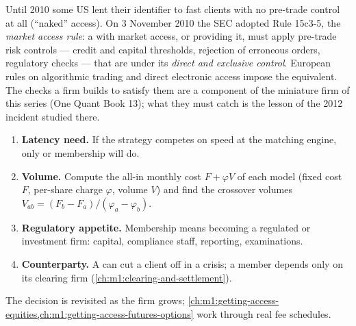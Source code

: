 \begin{remark}\label{rem:m1:exchanges-brokers-venues:15c35}
Until 2010 some US  lent their identifier to fast clients with no
pre-trade control at all (``naked'' access). On 3 November 2010 the SEC
adopted Rule 15c3-5, the \emph{market access rule}: a  with
market access, or providing it, must apply pre-trade risk controls ---
credit and capital thresholds, rejection of erroneous orders, regulatory
checks --- that are under its \emph{direct and exclusive control}. European
rules on algorithmic trading and direct electronic access impose the
equivalent. The checks a firm builds to satisfy them are a component of the
miniature firm of this series (One Quant Book 13); what they must catch is
the lesson of the 2012 incident studied there.
\end{remark}

\begin{method}\label{met:m1:exchanges-brokers-venues:choose}
\begin{enumerate}
\item \textbf{Latency need.} If the strategy competes on speed at the
  matching engine, only  or membership will do.
\item \textbf{Volume.} Compute the all-in monthly cost
  $F + \varphi V$ of each model (fixed cost $F$, per-share charge $\varphi$,
  volume $V$) and find the crossover volumes $V_{ab} = (F_b - F_a)/(\varphi_a
  - \varphi_b)$.
\item \textbf{Regulatory appetite.} Membership means becoming a regulated
   or investment firm: capital, compliance staff, reporting,
  examinations.
\item \textbf{Counterparty.} A  can cut a client off in a crisis; a
  member depends only on its clearing firm (\cref{ch:m1:clearing-and-settlement}).
\end{enumerate}
The decision is revisited as the firm grows;
\cref{ch:m1:getting-access-equities,ch:m1:getting-access-futures-options}
work through real fee schedules.
\end{method}

